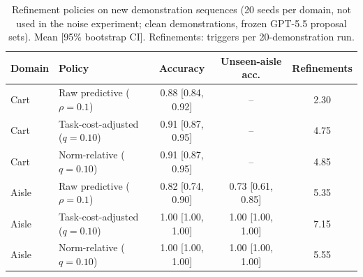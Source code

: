 \begin{table}[t]
\centering\small
\caption{Refinement policies on new demonstration sequences (20 seeds per domain, not used in the noise experiment;
clean demonstrations, frozen GPT-5.5 proposal sets). Mean [95\% bootstrap CI]. Refinements: triggers per 20-demonstration run.}
\label{tab:exp1-heldout}
\begin{tabular}{llccc}
\toprule
Domain & Policy & Accuracy & Unseen-aisle acc. & Refinements \\
\midrule
Cart & Raw predictive ($\rho=0.1$) & 0.88 [0.84, 0.92] & -- & 2.30 \\
Cart & Task-cost-adjusted ($q=0.10$) & 0.91 [0.87, 0.95] & -- & 4.75 \\
Cart & Norm-relative ($q=0.10$) & 0.91 [0.87, 0.95] & -- & 4.85 \\
\midrule
Aisle & Raw predictive ($\rho=0.1$) & 0.82 [0.74, 0.90] & 0.73 [0.61, 0.85] & 5.35 \\
Aisle & Task-cost-adjusted ($q=0.10$) & 1.00 [1.00, 1.00] & 1.00 [1.00, 1.00] & 7.15 \\
Aisle & Norm-relative ($q=0.10$) & 1.00 [1.00, 1.00] & 1.00 [1.00, 1.00] & 5.55 \\
\bottomrule
\end{tabular}
\end{table}
